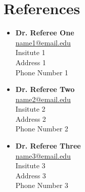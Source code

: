 \section{References}


\begin{itemize}
    
    \item[]
    \textbf{Dr. Referee One} \\
    \href{mailto:name1@email.edu}{name1@email.edu} \\
    Insitute 1 \\
    Address 1 \\
    Phone Number 1
    
    \item[]
    \textbf{Dr. Referee Two} \\
    \href{mailto:name2@email.edu}{name2@email.edu} \\
    Insitute 2 \\
    Address 2 \\
    Phone Number 2
    
    \item[]
    \textbf{Dr. Referee Three} \\
    \href{mailto:name3@email.edu}{name3@email.edu} \\
    Insitute 3 \\
    Address 3 \\
    Phone Number 3
    
\end{itemize}
